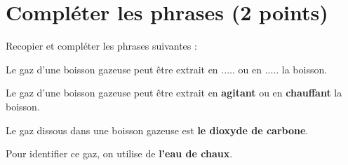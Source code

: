 \section{Compléter les phrases (2 points)}

Recopier et compléter les phrases suivantes :
\begin{questions}
	\question Le gaz d'une boisson gazeuse peut être extrait en $.....$ ou en $.....$ la boisson.
	\begin{solution}
		Le gaz d'une boisson gazeuse peut être extrait en \textbf{agitant} ou en \textbf{chauffant} la boisson.
	\end{solution}
	
	\question Le gaz dissous dans une boisson gazeuse est \textbf{le dioxyde de carbone}.
	
	
	\question Pour identifier ce gaz, on utilise de \textbf{l'eau de chaux}.
\end{questions}